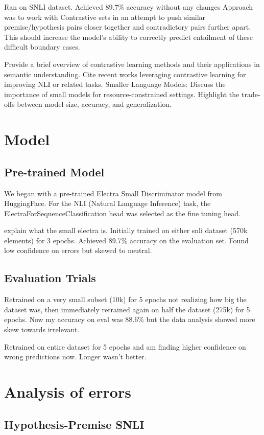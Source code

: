 \documentclass[11pt]{article}
\begin{document}
Ran on SNLI dataset. Achieved 89.7\% accuracy without any changes
Approach was to work with Contrastive sets in an attempt to push similar premise/hypothesis pairs closer together and contradictory pairs further apart. This should increase the model's ability to correctly predict entailment of these difficult boundary cases.

Provide a brief overview of contrastive learning methods and their applications in semantic understanding.
Cite recent works leveraging contrastive learning for improving NLI or related tasks.
Smaller Language Models:
Discuss the importance of small models for resource-constrained settings.
Highlight the trade-offs between model size, accuracy, and generalization.

\section{Model}
\subsection{Pre-trained Model}

We began with a pre-trained Electra Small Discriminator model from HuggingFace. For the NLI (Natural Language Inference) task, the ElectraForSequenceClassification head was selected as the fine tuning head. 

explain what the small electra is.
Initially trained on either snli dataset (570k elements) for 3 epochs. Achieved 89.7\% accuracy on the evaluation set. Found low confidence on errors but skewed to neutral.
\subsection{Evaluation Trials}
Retrained on a very small subset (10k) for 5 epochs not realizing how big the dataset was, then immediately retrained again on half the dataset (275k) for 5 epochs. Now my accuracy on eval was 88.6\% but the data analysis showed more skew towards irrelevant.

Retrained on entire dataset for 5 epochs and am finding higher confidence on wrong predictions now. Longer wasn't better.

\section{Analysis of errors}
\subsection{Hypothesis-Premise SNLI}
\end{document}
